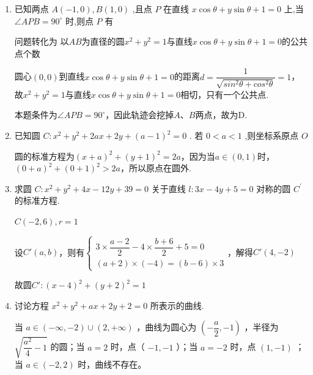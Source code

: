 \begin{enumerate}
    \item 已知两点 ${A}\left( {-1,0}\right) ,{B}\left( {1,0}\right)$ ,且点 ${P}$ 在直线 $x\cos \theta  + y\sin \theta  + 1 = 0$ 上,当 $\angle {APB} = {90}^{ \circ  }$ 时,则点 ${P}$ 有
    \begin{jieda}
        问题转化为 以$AB$为直径的圆$x^2+y^2 = 1$与直线$x\cos \theta  + y\sin \theta  + 1 = 0$的公共点个数

        圆心$(0, 0)$到直线$x\cos \theta  + y\sin \theta  + 1 = 0$的距离$d = \dfrac{1}{\sqrt{sin^2\theta + cos^2\theta}} = 1$，故$x^2+y^2 = 1$与直线$x\cos \theta  + y\sin \theta  + 1 = 0$相切，只有一个公共点.

        本题条件为$\angle {APB} = {90}^{ \circ  }$，因此轨迹会挖掉$A、B$两点，故为D.
    \end{jieda}


    \item 已知圆 $C : {x}^{2} + {y}^{2} + {2ax} + {2y} + {\left( a - 1\right) }^{2} = 0$ . 若 $0 < a < 1$ ,则坐标系原点 $O$
    \begin{jieda}
        圆的标准方程为$(x+a)^2+(y+1)^2 = 2a$，因为当$a \in (0, 1)$时，$(0+a)^2+(0+1)^2 > 2a$，所以原点在圆外.
    \end{jieda}

    \item 求圆 $C : {x}^{2} + {y}^{2} + {4x} - {12y} + {39} = 0$ 关于直线 $l : {3x} - {4y} + 5 = 0$ 对称的圆 ${C}^{\prime }$ 的标准方程.
    \begin{jieda}
        $C(-2, 6), r = 1$
        
        设$C'(a, b)$，则有$\left\{\begin{array}{l}
             3 \times \dfrac{a-2}{2} - 4 \times \dfrac{b+6}{2} + 5 = 0 \\
             (a+2) \times (-4) = (b-6) \times 3
        \end{array} \right.$，解得$C' (4, -2)$
        
        故圆$C' : (x-4)^2+(y+2)^2=1$
    \end{jieda}

    \item 讨论方程 ${x}^{2} + {y}^{2} + {ax} + {2y} + 2 = 0$ 所表示的曲线.
    \begin{jieda}
        当 $a \in(-\infty,-2) \cup(2,+\infty)$ ，曲线为圆心为 $\left(-\dfrac{a}{2},-1\right)$ ，半径为 $\sqrt{\dfrac{a^2}{4}-1}$ 的圆；当 $a=2$ 时，点（ $-1,-1$ ）；当 $a=-2$ 时，点 $(1,-1)$ ；当 $a \in(-2,2)$ 时，曲线不存在。
    \end{jieda}


\end{enumerate}
